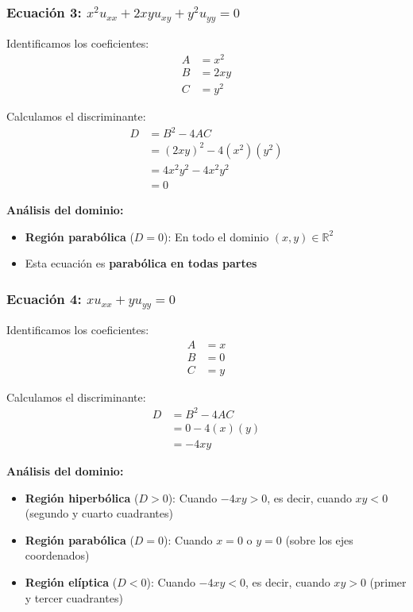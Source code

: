 \documentclass[a4paper]{article}
\begin{document}
\subsubsection{Ecuación 3: $x^2u_{xx} + 2xyu_{xy} + y^2u_{yy} = 0$}

Identificamos los coeficientes:
\begin{align}
A &= x^2 \\
B &= 2xy \\
C &= y^2
\end{align}

Calculamos el discriminante:
\begin{align}
D &= B^2 - 4AC \\
&= (2xy)^2 - 4(x^2)(y^2) \\
&= 4x^2y^2 - 4x^2y^2 \\
&= 0
\end{align}

\textbf{Análisis del dominio:}
\begin{itemize}
    \item \textbf{Región parabólica} ($D = 0$): En todo el dominio $(x, y) \in \mathbb{R}^2$
    \item Esta ecuación es \textbf{parabólica en todas partes}
\end{itemize}

\subsubsection{Ecuación 4: $xu_{xx} + yu_{yy} = 0$}

Identificamos los coeficientes:
\begin{align}
A &= x \\
B &= 0 \\
C &= y
\end{align}

Calculamos el discriminante:
\begin{align}
D &= B^2 - 4AC \\
&= 0 - 4(x)(y) \\
&= -4xy
\end{align}

\textbf{Análisis del dominio:}
\begin{itemize}
    \item \textbf{Región hiperbólica} ($D > 0$): Cuando $-4xy > 0$, es decir, cuando $xy < 0$ (segundo y cuarto cuadrantes)
    \item \textbf{Región parabólica} ($D = 0$): Cuando $x = 0$ o $y = 0$ (sobre los ejes coordenados)
    \item \textbf{Región elíptica} ($D < 0$): Cuando $-4xy < 0$, es decir, cuando $xy > 0$ (primer y tercer cuadrantes)
\end{itemize}
\end{document}
